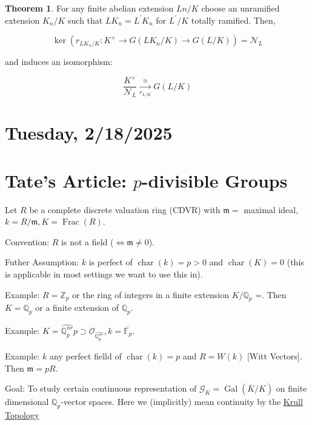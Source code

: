\documentclass{article}
\theoremstyle{definition}
\newtheorem{theorem}{Theorem}
\numberwithin{theorem}{subsection}
\begin{document}
    \begin{theorem}
        For any finite abelian extension \(Ln / K\) choose an unramified extension \(K_n / K\) such that \(L K_n = L^{\prime} K_n\) for \(L^{\prime} / K\) totally ramified. Then,

        \[
            \ker(r_{L K_n / K}: K^\times \to G(LK_n / K) \to G(L / K)) = \mathcal{N}_L
        \]

        and induces an isomorphism:

        \[
            \frac{K^\times}{\mathcal{N}_L} \xrightarrow[r_{L / K}]{\cong} G(L / K)
        \]
    \end{theorem}

    \newpage

    \section*{Tuesday, 2/18/2025}
    
    \section{Tate's Article: \(p\)-divisible Groups}

    Let \(R\) be a complete discrete valuation ring (CDVR) with \(\mathfrak{m} =\) maximal ideal, \(k = R / \mathfrak{m}, K = \operatorname{Frac}(R)\).

    Convention: \(R\) is not a field (\(\iff \mathfrak{m} \neq 0\)).

    Futher Assumption: \(k\) is perfect of \(\operatorname{char}(k) = p > 0\) and \(\operatorname{char}(K) = 0\)  (this is applicable in most settings we want to use this in).

    Example: \(R = \mathbb{Z}_p\) or the ring of integers in a finite extension \(K / \mathbb{Q}_p\) =. Then \(K = \mathbb{Q}_p\) or a finite extension of \(\mathbb{Q}_p\).

    Example: \(K = \widehat{\mathbb{Q}_p^{nr}} p\supset \mathcal{O}_{\widehat{\mathbb{Q}_p^{nr}}}, k = \overline{\mathbb{F}_p}\).

    Example: \(k\) any perfect fielld of \(\operatorname{char}(k) = p\) and \(R = W(k)\) [Witt Vectors]. Then \(\mathfrak{m} = pR\).

    Goal: To study certain continuous representation of \(\mathscr{G}_K = \operatorname{Gal}(\overline{K} / K)\) on finite dimensional \(\mathbb{Q}_p\)-vector spaces. Here we (implicitly) mean continuity by the \underline{Krull Topology}
\end{document}
